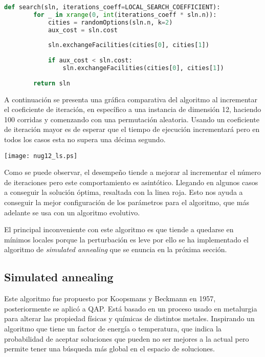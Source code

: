 \begin{lstlisting}[language=Python]
    def search(sln, iterations_coeff=LOCAL_SEARCH_COEFFICIENT):
        for _ in xrange(0, int(iterations_coeff * sln.n)):
            cities = randomOptions(sln.n, k=2)
            aux_cost = sln.cost
    
            sln.exchangeFacilities(cities[0], cities[1])
    
            if aux_cost < sln.cost:
                sln.exchangeFacilities(cities[0], cities[1])
    
        return sln
\end{lstlisting}

A continuación se presenta una gráfica comparativa del algoritmo al incrementar el coeficiente de iteración, en específico a una instancia de dimensión 12, haciendo 100 corridas y comenzando con una permutación aleatoria. Usando un coeficiente de iteración mayor es de esperar que el tiempo de ejecución incrementará pero en todos los casos esta no supera una décima segundo.

\begin{center}
    \texttt{[image: nug12\_ls.ps]}
\end{center}

Como se puede observar, el desempeño tiende a mejorar al incrementar el número de iteraciones pero este comportamiento es asintótico. Llegando en algunos casos a conseguir la solución óptima, resaltada con la linea roja. Esto nos ayuda a conseguir la mejor configuración de los parámetros para el algoritmo, que más adelante se usa con un algoritmo evolutivo.

El principal inconveniente con este algoritmo es que tiende a quedarse en mínimos locales porque la perturbación es leve por ello se ha implementado el algoritmo de \textit{simulated annealing} que se enuncia en la próxima sección.

\subsection*{Simulated annealing}

Este algoritmo fue propuesto por Koopsmans y Beckmann en 1957\cite{koopmans1957assignment}, posteriormente se aplicó a QAP. Está basado en un proceso usado en metalurgia para alterar las propiedad físicas y químicas de distintos metales. Inspirando un algoritmo que tiene un factor de energía o temperatura, que indica la probabilidad de aceptar soluciones que pueden no ser mejores a la actual pero permite tener una búsqueda más global en el espacio de soluciones\cite{sm:10:advcomp}.

